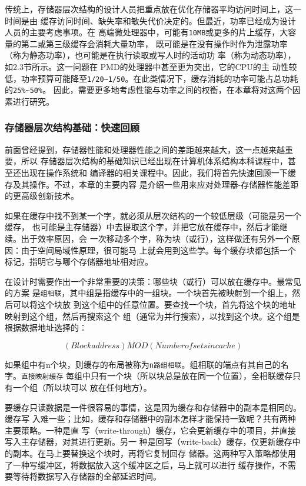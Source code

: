 传统上，存储器层次结构的设计人员把重点放在优化存储器平均访问时间上，这一时间是由
缓存访问时间、缺失率和敏失代价决定的。但最近，功率已经成为设计人员的主要考虑事项。在
高端微处理器中，可能有\verb|10MB|或更多的片上缓存，大容量的第二或第三级缓存会消耗大量功率，
既可能是在没有操作时作为泄露功率（称为静态功率），也可能是在执行读取或写人时的活动功
率（称为动态功率），如2.3节所示。这一问题在 PMD的处理器中甚至更为突出，它的CPU的主
动性较低，功率预算可能降至\verb|1/20~1/50|。在此类情况下，缓存消耗的功率可能占总功耗的\verb|25%~50%|。
因此，需要更多地考虑性能与功率之间的权衡，在本章将对这两个因素进行研究。

\subsubsection{存储器层次结构基础：快速回顾}

前面曾经提到，存储器性能和处理器性能之间的差距越来越大，这一点越来越重要，所以
存储器层次结构的基础知识已经出现在计算机体系结构本科课程中，甚至还出现在操作系统和
编译器的相关课程中。因此，我们将首先快速回顾一下缓存及其操作。不过，本章的主要内容
是介绍一些用来应对处理器-存储器性能差距的更高级创新技术。

如果在缓存中找不到某一个字，就必须从层次结构的一个较低层级（可能是另一个缓存，
也可能是主存储器）中去提取这个字，并把它放在缓存中，然后才能继续。出于效率原因，会
一次移动多个字，称为块（或行），这样做还有另外一个原因：由于空间局域性原理，很可能马
上就会用到这些学。每个缓存块都包括一个标记，指明它与哪个存储器地址相对应。

在设计时需要作出一个非常重要的决策：哪些块（或行）可以放在缓存中。最常见的方案
是\verb|组相联|，其中组是指缓存中的一组块。一个块首先被映射到一个组上，然后可以将这个块放
到这个组中的任意位置。要查找一个块，首先将这个块的地址映射到这个组，然后再搜索这个
组（通常为并行搜索），以找到这个块。这个组是根据数据地址选择的：

\begin{equation}
    (Block address) MOD (Number of sets in cache)
\end{equation}

如果组中有n个块，则缓存的布局被称为\verb|n路组相联|。组相联的端点有其自己的名字。\verb|直接映射缓存|
每组中只有一个块（所以块总是放在同一个位置），全相联缓存只有一个组（所以块可以
放在任何地方）。

要缓存只读数据是一件很容易的事情，这是因为缓存和存储器中的副本是相同的。缓存写
入难一些；比如，缓存和存储器中的副本怎样才能保持一致呢？共有两种主要策略。一种是直
写（write-through）缓存，它会更新缓存中的项目，并直接写入主存储器，对其进行更新。另一
种是回写（write-back）缓存，仅更新缓存中的副本。在马上要替换这个块时，再将它复制回存
储器。这两种写入策略都使用了一种写缓冲区，将数据放入这个缓冲区之后，马上就可以进行
缓存操作，不需要等待将数据写入存储器的全部延迟时间。

